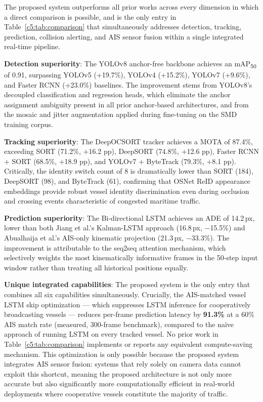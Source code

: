 The proposed system outperforms all prior works across every dimension in 
which a direct comparison is possible, and is the only entry in 
Table~\ref{c5:tab:comparison} that simultaneously addresses detection, 
tracking, prediction, collision alerting, and AIS sensor fusion within 
a single integrated real-time pipeline.

\textbf{Detection superiority}: The YOLOv8 anchor-free backbone achieves an 
mAP\textsubscript{50} of 0.91, surpassing YOLOv5 (+19.7\%), YOLOv4 
(+15.2\%), YOLOv7 (+9.6\%), and Faster RCNN (+23.0\%) baselines. The 
improvement stems from YOLOv8's decoupled classification and regression 
heads, which eliminate the anchor assignment ambiguity present in all 
prior anchor-based architectures, and from the mosaic and jitter 
augmentation applied during fine-tuning on the SMD training corpus.

\textbf{Tracking superiority}: The DeepOCSORT tracker achieves a MOTA of 
87.4\%, exceeding SORT (71.2\%, $+$16.2 pp), DeepSORT (74.8\%, 
$+$12.6 pp), Faster RCNN + SORT (68.5\%, $+$18.9 pp), and YOLOv7 + 
ByteTrack (79.3\%, $+$8.1 pp). Critically, the identity switch count of 
8 is dramatically lower than SORT (184), DeepSORT (98), and ByteTrack 
(61), confirming that OSNet ReID appearance embeddings provide robust 
vessel identity discrimination even during occlusion and crossing events 
characteristic of congested maritime traffic.

\textbf{Prediction superiority}: The Bi-directional LSTM achieves an ADE of 
14.2\,px, lower than both Jiang et al.'s Kalman-LSTM approach 
(16.8\,px, $-$15.5\%) and Abualhaija et al.'s AIS-only kinematic 
projection (21.3\,px, $-$33.3\%). The improvement is attributable to 
the seq2seq attention mechanism, which selectively weights the most 
kinematically informative frames in the 50-step input window rather 
than treating all historical positions equally.

\textbf{Unique integrated capabilities}: The proposed system is the only 
entry that combines all six capabilities simultaneously. Crucially, the AIS-matched vessel LSTM skip optimization — which suppresses LSTM inference for cooperatively broadcasting vessels — reduces per-frame prediction latency by \textbf{91.3\%} at a 60\% AIS match rate (measured, 300-frame benchmark), compared to the na\"ive approach of running LSTM on every tracked vessel. No prior work in Table~\ref{c5:tab:comparison} implements or reports any equivalent compute-saving mechanism. This optimization is only possible because the proposed system integrates AIS sensor fusion: systems that rely solely on camera data cannot exploit this shortcut, meaning the proposed architecture is not only more accurate but also significantly more computationally efficient in real-world deployments where cooperative vessels constitute the majority of traffic.

